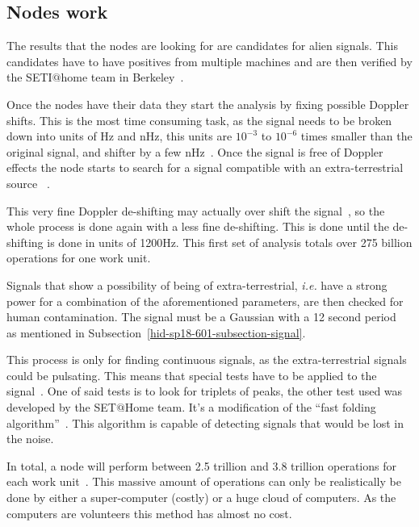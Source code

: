 \subsection{Nodes work}\label{hid-sp18-601-subsection-nodes-work}
The results that the nodes are looking for are candidates for alien signals.
This candidates have to have positives from multiple machines and are then 
verified by the SETI$@$home team in 
Berkeley~\cite{hid-sp18-601-www-sathome-howworks}.

Once the nodes have their data they start the analysis by fixing possible 
Doppler shifts. This is the most time consuming task, as the signal needs to be 
broken down into units of Hz and nHz, this units are $10^{-3}$ to $10^{-6}$ 
times smaller than the original signal, and shifter by a few 
nHz~\cite{hid-sp18-601-www-sathome-howworks}. Once the signal is free of Doppler
 effects the node starts to search for a signal compatible with an 
extra-terrestrial source
~\cite{hid-sp18-601-www-sathome-howworks,hid-sp18-601-paper-cocconi1959searching}.

This very fine Doppler de-shifting may actually over shift the 
signal~\cite{hid-sp18-601-www-sathome-howworks}, so the whole
process is done again with a less fine de-shifting. This is done until the 
de-shifting
is done in units of 1200Hz. This first set of analysis totals over 275 billion 
operations for one work unit.

Signals that show a possibility of being of extra-terrestrial, \textit{i.e.} 
have a strong power for a combination of the aforementioned parameters, are then 
 checked for human contamination. The signal must be 
a Gaussian with a 12 second period~\cite{hid-sp18-601-paper-anderson2002seti} as
mentioned in Subsection~\ref{hid-sp18-601-subsection-signal}.

This process is only for finding continuous signals, as the extra-terrestrial 
signals could be pulsating. This means that special tests have to be applied 
to the signal~\cite{hid-sp18-601-www-sathome-howworks}. One of said tests is 
to look for triplets of peaks, the other test
used was developed by the SET$@$Home team. It's a modification of the 
``fast folding algorithm''~\cite{hid-sp18-601-paper-korpela2001seti}.
This algorithm is capable of detecting signals that would be lost in the noise.

In total, a node will perform between 2.5 trillion and 3.8 trillion operations 
for each work unit~\cite{hid-sp18-601-www-sathome-howworks}. 
This massive amount of operations can only be realistically 
be done by either a super-computer (costly) or a huge cloud of computers. As the
 computers are volunteers this method has almost no cost.

